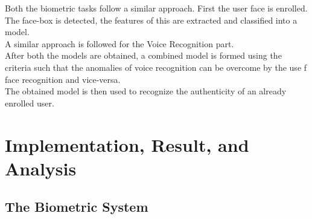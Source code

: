 Both the biometric tasks follow a similar approach. First the user face is enrolled. The face-box is detected, the features of this are extracted  and classified into a model. \\
A similar approach is followed for the Voice Recognition part. \\
After both the models are obtained, a combined model is formed using the criteria such that the anomalies of voice recognition can be overcome by the use f face recognition and vice-versa. \\
The obtained model is then used to recognize the authenticity of an already enrolled user.


\chapter{Implementation, Result, and Analysis}



\newpage



\section{The Biometric System}



